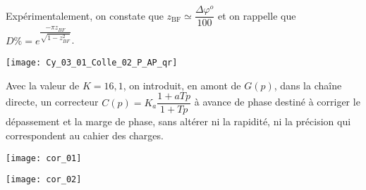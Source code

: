 




Expérimentalement, on constate que 
$z_{\text{BF}}\simeq \dfrac{\Delta \varphi ^{o}}{100}$ 
et on rappelle que $D\% = e^{\dfrac{-\pi z_{BF}}{\sqrt{1-z_{BF}^2}}}$.


\ifprof
\else
\begin{marginfigure}
\centering
\texttt{[image: Cy\_03\_01\_Colle\_02\_P\_AP\_qr]}
\end{marginfigure}
\fi


Avec la valeur de $K=16,1$, on introduit, en amont de $G(p)$, dans la chaîne directe, un correcteur $C(p)=K_a \dfrac{1+aTp}{1+Tp}$ à avance de phase destiné à corriger le dépassement et la marge de phase, sans altérer ni la rapidité, ni la précision qui correspondent au cahier des charges.





\ifprof

\begin{center}

\texttt{[image: cor\_01]}

\texttt{[image: cor\_02]}
\end{center}
\else
\fi
